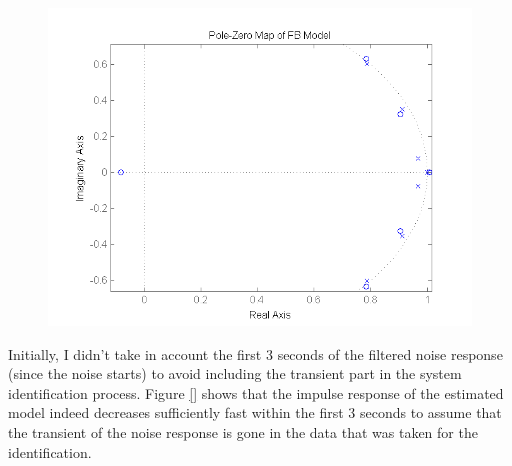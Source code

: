 \begin{figure}[H]
\centering
\includegraphics[width=1.0\textwidth]{pics/pole_FB}
\caption{}
\label{pic:}
\end{figure}

Initially, I didn't take in account the first 3 seconds of the filtered noise response (since the noise starts) to avoid including the transient part in the system identification process.  Figure \ref{} shows that the impulse response of the estimated model indeed decreases sufficiently fast within the first 3 seconds to assume that the transient of the noise response is gone in the data that was taken for the identification.

